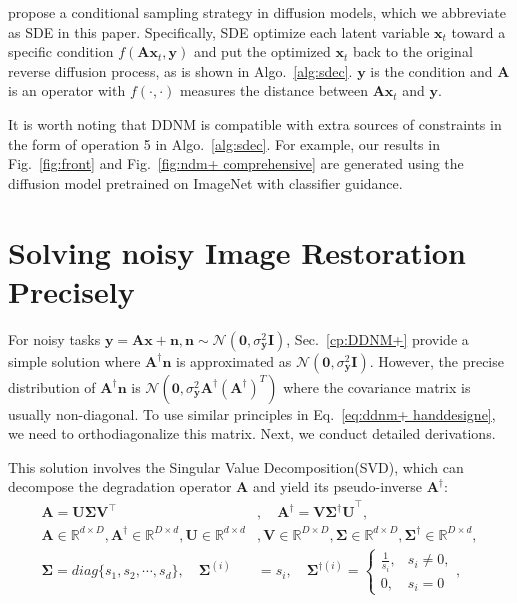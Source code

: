 \documentclass{article} \usepackage{iclr2023_conference,times}
\begin{document}
\newpage

\cite{song2020score} propose a conditional sampling strategy in diffusion models, which we abbreviate as SDE in this paper. Specifically, SDE optimize each latent variable $\mathbf{x}_{t}$ toward a specific condition $f(\mathbf{A}\mathbf{x}_{t},\mathbf{y})$ and put the optimized $\mathbf{x}_{t}$ back to the original reverse diffusion process, as is shown in Algo.~\ref{alg:sdec}. $\mathbf{y}$ is the condition and $\mathbf{A}$ is an operator with $f(\cdot,\cdot)$ measures the distance between $\mathbf{A}\mathbf{x}_{t}$ and $\mathbf{y}$. 

It is worth noting that DDNM is compatible with extra sources of constraints in the form of operation 5 in Algo.~\ref{alg:sdec}. For example, our results in Fig.~\ref{fig:front} and Fig.~\ref{fig:ndm+ comprehensive} are generated using the diffusion model pretrained on ImageNet with classifier guidance.




\section{Solving noisy Image Restoration Precisely}
\label{ap:ndm+}
For noisy tasks $\mathbf{y}=\mathbf{Ax+n}, \mathbf{n}\sim\mathcal{N}(\mathbf{0}, \sigma_{\mathbf{y}}^2\mathbf{I})$, Sec.~\ref{cp:DDNM+} provide a simple solution where $\mathbf{A}^{\dagger}\mathbf{n}$ is approximated as $\mathcal{N}(\mathbf{0}, \sigma_{\mathbf{y}}^2\mathbf{I})$. However, the precise distribution of $\mathbf{A}^{\dagger}\mathbf{n}$ is $\mathcal{N}(\mathbf{0}, \sigma_{\mathbf{y}}^2\mathbf{A}^{\dagger}(\mathbf{A}^{\dagger})^{T})$ where the covariance matrix is usually non-diagonal. To use similar principles in Eq.~\ref{eq:ddnm+ handdesigne}, we need to 
orthodiagonalize this matrix. Next, we conduct detailed derivations.


This solution involves the Singular Value Decomposition(SVD), which can decompose the degradation operator $\mathbf{A}$ and yield its pseudo-inverse $\mathbf{A}^\dagger$:
\begin{align}
    \mathbf{A}=\mathbf{U\Sigma V}^{\top}&,\quad\mathbf{A}^{\dagger}=\mathbf{V\Sigma^{\dagger}U}^{\top},\\
    \mathbf{A}\in \mathbb{R}^{d\times D},
    \mathbf{A}^\dagger\in \mathbb{R}^{D\times d},
    \mathbf{U}\in \mathbb{R}^{d\times d}&,
    \mathbf{V}\in \mathbb{R}^{D\times D},
    \mathbf{\Sigma}\in \mathbb{R}^{d\times D},
    \mathbf{\Sigma}^\dagger\in \mathbb{R}^{D\times d},\\
    \mathbf{\Sigma}=diag\{s_1, s_2, \cdots, s_d\},\quad
    \mathbf{\Sigma}^{(i)}&=s_i,\quad\mathbf{\Sigma}^{\dagger(i)}=\begin{cases}
        \frac{1}{s_i}, & s_i \neq 0 , \\
        0, & s_i = 0
    \end{cases},
\end{align}
\end{document}
